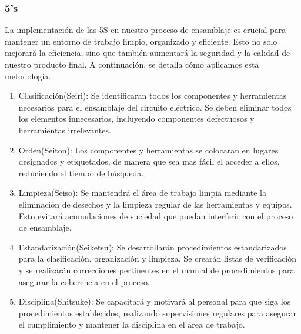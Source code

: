     \subsubsection{5's}
    La implementación de las 5S en nuestro proceso de ensamblaje es crucial para mantener un entorno de trabajo limpio, organizado y eficiente. Esto no solo mejorará la eficiencia, sino que también aumentará la seguridad y la calidad de nuestro producto final. A continuación, se detalla cómo aplicamos esta metodología. 
    \begin{enumerate}
        \item Clasificación(Seiri): Se identificaran todos los componentes y herramientas necesarios para el ensamblaje del circuito eléctrico. Se deben eliminar todos los elementos innecesarios, incluyendo componentes defectuosos y herramientas irrelevantes. 
        \item Orden(Seiton): Los componentes y herramientas se colocaran en lugares designados y etiquetados, de manera que sea mas fácil el acceder a ellos, reduciendo el tiempo de búsqueda.
        \item Limpieza(Seiso): Se mantendrá el área de trabajo limpia mediante la eliminación de desechos y la limpieza regular de las herramientas y equipos. Esto evitará acumulaciones de suciedad que puedan interferir con el proceso de ensamblaje.
        \item Estandarización(Seiketsu): Se desarrollarán procedimientos estandarizados para la clasificación, organización y limpieza. Se crearán listas de verificación y se realizarán correcciones pertinentes en el manual de procedimientos para asegurar la coherencia en el proceso.
        \item Disciplina(Shitsuke): Se capacitará y motivará al personal para que siga los procedimientos establecidos, realizando supervisiones regulares para asegurar el cumplimiento y mantener la disciplina en el área de trabajo.
    \end{enumerate}
    
